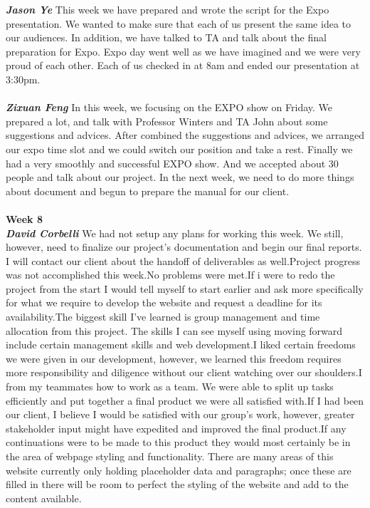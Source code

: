 \documentclass[onecolumn, draftclsnofoot,10pt, compsoc]{IEEEtran}
\begin{document}
\textbf{\textit{Jason Ye}}
This week we have prepared and wrote the script for the Expo presentation. We wanted to make sure that each of us present the same idea to our audiences. In addition, we have talked to TA and talk about the final preparation for Expo. Expo day went well as we have imagined and we were very proud of each other. Each of us checked in at 8am and ended our presentation at 3:30pm.\\ \\
\textbf{\textit{Zixuan Feng}}
In this week, we focusing on the EXPO show on Friday. We prepared a lot, and talk with Professor Winters and TA John about some suggestions and advices. After combined the suggestions and advices, we arranged our expo time slot and we could switch our position and take a rest. Finally we had a very smoothly and successful EXPO show. And we accepted about 30 people and talk about our project. In the next week, we need to do more things about document and begun to prepare the manual for our client.\\ \\
\textbf{Week 8}
\\ \textbf{\textit{David Corbelli}}
We had not setup any plans for working this week. We still, however, need to finalize our project's documentation and begin our final reports. I will contact our client about the handoff of deliverables as well.Project progress was not accomplished this week.No problems were met.If i were to redo the project from the start I would tell myself to start earlier and ask more specifically for what we require to develop the website and request a deadline for its availability.The biggest skill I've learned is group management and time allocation from this project. The skills I can see myself using moving forward include certain management skills and web development.I liked certain freedoms we were given in our development, however, we learned this freedom requires more responsibility and diligence without our client watching over our shoulders.I from my teammates how to work as a team. We were able to split up tasks efficiently and put together a final product we were all satisfied with.If I had been our client, I believe I would be satisfied with our group's work, however, greater stakeholder input might have expedited and improved the final product.If any continuations were to be made to this product they would most certainly be in the area of webpage styling and functionality. There are many areas of this website currently only holding placeholder data and paragraphs; once these are filled in there will be room to perfect the styling of the website and add to the content available.\\ \\
\end{document}
